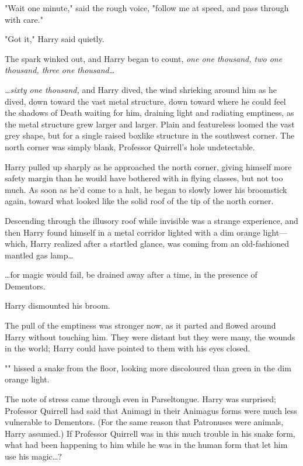 "Wait one minute," said the rough voice, "follow me at speed, and pass through
with care."

"Got it," Harry said quietly.

The spark winked out, and Harry began to count, \emph{one one thousand, two one
thousand, three one thousand{\ldots}}

\emph{{\ldots}sixty one thousand,} and Harry dived, the wind shrieking around
him as he dived, down toward the vast metal structure, down toward where he
could feel the shadows of Death waiting for him, draining light and radiating
emptiness, as the metal structure grew larger and larger. Plain and featureless
loomed the vast grey shape, but for a single raised boxlike structure in the
southwest corner. The north corner was simply blank, Professor Quirrell's hole
undetectable.

Harry pulled up sharply as he approached the north corner, giving himself more
safety margin than he would have bothered with in flying classes, but not too
much. As soon as he'd come to a halt, he began to slowly lower his broomstick
again, toward what looked like the solid roof of the tip of the north corner.

Descending through the illusory roof while invisible was a strange experience,
and then Harry found himself in a metal corridor lighted with a dim orange
light---which, Harry realized after a startled glance, was coming from an
old-fashioned mantled gas lamp{\ldots}

{\ldots}for magic would fail, be drained away after a time, in the presence of
Dementors.

Harry dismounted his broom.

The pull of the emptiness was stronger now, as it parted and flowed around
Harry without touching him. They were distant but they were many, the wounds in
the world; Harry could have pointed to them with his eyes closed.

"" hissed a snake from the floor, looking more
discoloured than green in the dim orange light.

The note of stress came through even in Parseltongue. Harry was surprised;
Professor Quirrell had said that Animagi in their Animagus forms were much less
vulnerable to Dementors. (For the same reason that Patronuses were animals,
Harry assumed.) If Professor Quirrell was in this much trouble in his snake
form, what had been happening to him while he was in the human form that let
him use his magic{\ldots}?

